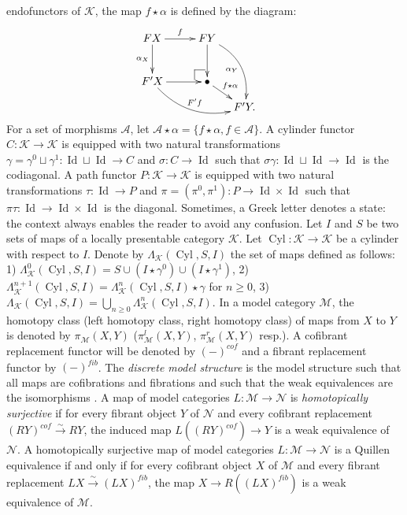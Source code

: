 \documentclass[a4paper,12pt]{amsart}
\begin{document}
endofunctors of ${\mathcal{K}}$, the map $f\star \alpha$ is defined by the
diagram:
\[
\xymatrix@C=1em@R=1em{
FX {\ar@{->}[dd]_-{{\alpha_X}}}{\ar@{->}[rr]^-{{f}}} && FY {\ar@{->}[dd]_-{{}}}\ar@/^15pt/@{->}[dddr]_-{\alpha_Y} &\\
&& &&\\
F'X \ar@/_15pt/@{->}[rrrd]^-{F'f}{\ar@{->}[rr]^-{{}}} &&  \bullet {  \ar@{-}[]+L+<-6pt,+2pt>;[]+LU+<-6pt,+6pt>  \ar@{-}[]+U+<-2pt,+6pt>;[]+LU+<-6pt,+6pt>}\ar@{->}[rd]^-{f\star \alpha} & \\
&& & F'Y.
}
\]
For a set of morphisms $\mathcal{A}$, let $\mathcal{A} \star \alpha =
\{f\star \alpha, f\in \mathcal{A}\}$. A cylinder functor $C:{\mathcal{K}} \to {\mathcal{K}}$
is equipped with two natural transformations $\gamma = \gamma^0 \sqcup
\gamma^1:\operatorname{Id} \sqcup \operatorname{Id} \to C$ and $\sigma:C\to \operatorname{Id}$ such that
$\sigma\gamma:\operatorname{Id}\sqcup \operatorname{Id} \to \operatorname{Id}$ is the codiagonal. A path functor
$P:{\mathcal{K}}\to {\mathcal{K}}$ is equipped with two natural transformations $\tau:\operatorname{Id}
\to P$ and $\pi=(\pi^0,\pi^1):P\to \operatorname{Id} \times \operatorname{Id}$ such that $\pi\tau:\operatorname{Id}
\to \operatorname{Id}\times \operatorname{Id}$ is the diagonal. Sometimes, a Greek letter denotes a
state: the context always enables the reader to avoid any
confusion. Let $I$ and $S$ be two sets of maps of a locally
presentable category ${\mathcal{K}}$. Let $\operatorname{{Cyl}}:{\mathcal{K}}\to {\mathcal{K}}$ be a cylinder with
respect to $I$. Denote by $\Lambda_{\mathcal{K}}(\operatorname{{Cyl}},S,I)$ the set of maps
defined as follows: 1) $\Lambda^0_{\mathcal{K}}(\operatorname{{Cyl}},S,I) = S \cup (I \star
\gamma^0) \cup (I \star \gamma^1)$, 2) $\Lambda^{n+1}_{\mathcal{K}}(\operatorname{{Cyl}},S,I) =
\Lambda^n_{\mathcal{K}}(\operatorname{{Cyl}},S,I) \star \gamma$ for $n{\geqslant} 0$, 3)
$\Lambda_{\mathcal{K}}(\operatorname{{Cyl}},S,I) = \bigcup_{n{\geqslant} 0} \Lambda^n_{\mathcal{K}}(\operatorname{{Cyl}},S,I)$. In
a model category $\mathcal{M}$, the homotopy class (left homotopy
class, right homotopy class) of maps from $X$ to $Y$ is denoted by
$\pi_\mathcal{M}(X,Y)$ ($\pi^l_\mathcal{M}(X,Y)$,
$\pi^r_\mathcal{M}(X,Y)$ resp.). A cofibrant replacement functor will
be denoted by $(-)^{cof}$ and a fibrant replacement functor by
$(-)^{fib}$. The \emph{discrete model structure} is the model
structure such that all maps are cofibrations and fibrations and such
that the weak equivalences are the isomorphisms \cite{discrete}. A map
of model categories $L:\mathcal{M} \to \mathcal{N}$ is
\emph{homotopically surjective} \cite[Definition~3.1]{MR1870516} if
for every fibrant object $Y$ of $\mathcal{N}$ and every cofibrant
replacement $(RY)^{cof} \stackrel{\sim}\to RY$, the induced map
$L((RY)^{cof}) \to Y$ is a weak equivalence of $\mathcal{N}$. A
homotopically surjective map of model categories $L:\mathcal{M} \to
\mathcal{N}$ is a Quillen equivalence if and only if for every
cofibrant object $X$ of $\mathcal{M}$ and every fibrant replacement
$LX \stackrel{\sim}\to (LX)^{fib}$, the map $X \to R((LX)^{fib})$ is a
weak equivalence of $\mathcal{M}$.
\end{document}
